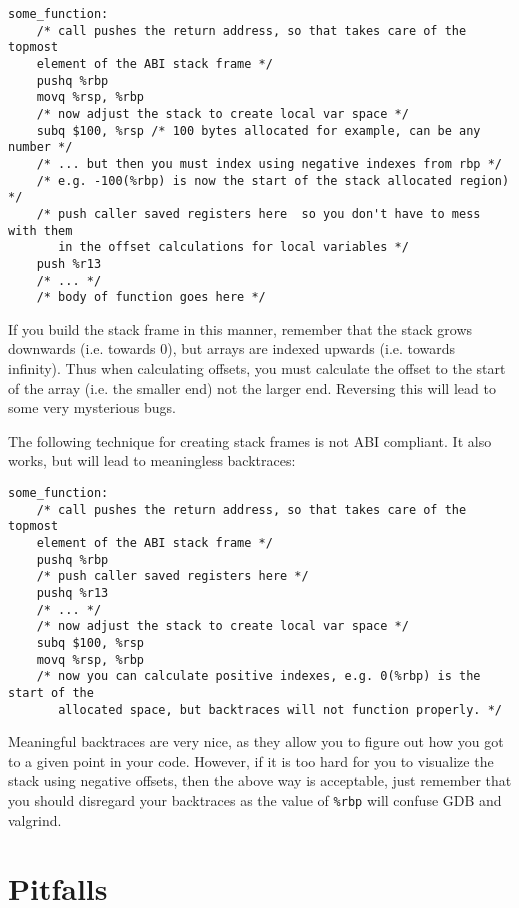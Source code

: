 \documentclass[11pt]{article}
\begin{document}
\begin{lstlisting}[caption={ABI-compliant stack frame construction}, captionpos=b]
some_function:
    /* call pushes the return address, so that takes care of the topmost
    element of the ABI stack frame */
    pushq %rbp
    movq %rsp, %rbp
    /* now adjust the stack to create local var space */
    subq $100, %rsp /* 100 bytes allocated for example, can be any number */
    /* ... but then you must index using negative indexes from rbp */
    /* e.g. -100(%rbp) is now the start of the stack allocated region) */
    /* push caller saved registers here  so you don't have to mess with them
       in the offset calculations for local variables */
    push %r13
    /* ... */
    /* body of function goes here */
\end{lstlisting}

If you build the stack frame in this manner, remember that the stack grows downwards (i.e.
towards 0), but arrays are indexed upwards (i.e. towards infinity). Thus when calculating
offsets, you must calculate the offset to the start of the array (i.e. the smaller end)
not the larger end. Reversing this will lead to some very mysterious bugs.

The following technique for creating stack frames is not ABI compliant. It also works, but
will lead to meaningless backtraces:

\begin{lstlisting}[caption={Non-compliant stack frame construction}, captionpos=b]
some_function:
    /* call pushes the return address, so that takes care of the topmost
    element of the ABI stack frame */
    pushq %rbp
    /* push caller saved registers here */
    pushq %r13
    /* ... */
    /* now adjust the stack to create local var space */
    subq $100, %rsp
    movq %rsp, %rbp
    /* now you can calculate positive indexes, e.g. 0(%rbp) is the start of the
       allocated space, but backtraces will not function properly. */
\end{lstlisting}

Meaningful backtraces are very nice, as they allow you to figure out how you got to a
given point in your code. However, if it is too hard for you to visualize the stack using
negative offsets, then the above way is acceptable, just remember that you should
disregard your backtraces as the value of \texttt{\%rbp} will confuse GDB and valgrind.

\section{Pitfalls}
\end{document}
